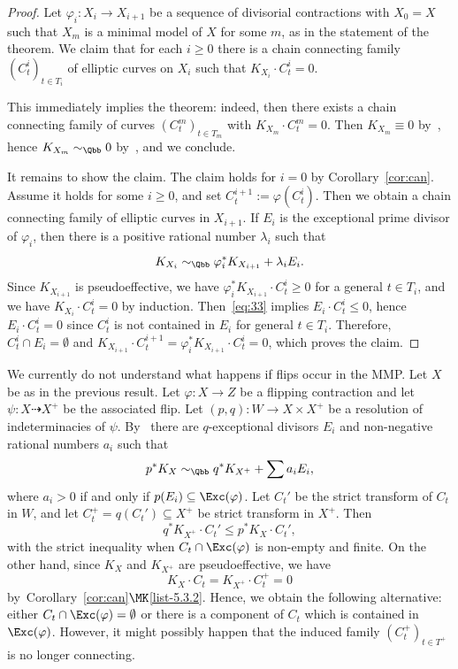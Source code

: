 \begin{proof}
Let $\varphi_i\colon X_i \to X_{i+1}$ be a sequence of divisorial contractions with $X_0=X$ such that $X_m$ is a minimal model of $X$ for some $m$, as in the statement of the theorem. We claim that for each $i\geq0$ there is a chain connecting family $(C_t^i)_{t\in T_i}$ of elliptic curves on $X_i$ such that $K_{X_i} \cdot C_t^i = 0$.

This immediately implies the theorem: indeed, then there exists a chain connecting family of curves $(C_t^m)_{t\in T_m}$ with $K_{X_m}\cdot C_t^m=0$. Then $K_{X_m} \equiv 0 $ by~\cite[Theorem~2.6]{BCE+}, hence $K_{X_m}\sim_\Qbb0$ by~\cite[Theorem~8.2]{Kaw85b}, and we conclude.


It remains to show the claim. The claim holds for $i=0$ by Corollary~\ref{cor:can}. Assume it holds for some $i\geq0$, and set $C_t^{i+1}:=\varphi(C_t^i)$. Then we obtain a chain connecting family of elliptic curves in $X_{i+1}$. If $E_i$ is the exceptional prime divisor of $\varphi_i$, then there is a positive rational number $\lambda_i$ such that
\begin{equation}\label{eq:33}
K_{X_i} \sim_\Qbb \varphi_i^*K_{X_{i+1}} + \lambda_i E_i.
\end{equation}
Since $K_{X_{i+1}}$ is pseudoeffective, we have $\varphi_i^*K_{X_{i+1}} \cdot C_t^i \geq 0 $ for a general $t\in T_i$, and we have $K_{X_i}\cdot C_t^i=0$ by induction. Then~\eqref{eq:33} implies $E_i \cdot C_t^i \leq 0$, hence $ E_i \cdot C_t^i = 0$ since $C_t^i$ is not contained in $E_i$ for general $t\in T_i$. Therefore, $C_t^i\cap E_i=\emptyset$ and $K_{X_{i+1}}\cdot C_t^{i+1}=\varphi_i^*K_{X_{i+1}} \cdot C_t^i = 0$, which proves the claim.
\end{proof}

\begin{rema}\label{rem1}
We currently do not understand what happens if flips occur in the MMP. Let $X$ be as in the previous result. Let $\varphi\colon X\to Z$ be a flipping contraction and let $ \psi\colon X \dasharrow X^+$ be the associated flip. Let $ (p,q)\colon W \to X\times X^+$ be a resolution of indeterminacies of $\psi$. By~\cite[Lemma~3.38]{KM98} there are $q$-exceptional divisors $E_i$ and non-negative rational numbers $a_i $ such that
\[
p^*K_X \sim_{\Qbb} q^*K_{X^+} + \sum a_i E_i,
\]
where $a_i>0$ if and only if $p(E_i)\subseteq\Exc(\varphi)$. Let $C_t'$ be the strict transform of $C_t$ in $W$, and let $C_t^+ = q(C_t') \subseteq X^+$ be strict transform in $X^+$. Then
\[
q^*K_{X^+} \cdot C_t' \leq p^*K_X \cdot C_t',
\]
with the strict inequality when $C_t\cap\Exc(\varphi)$ is non-empty and finite. On the other hand, since $K_X$ and $K_{X^+}$ are pseudoeffective, we have
\[
K_X\cdot C_t= K_{X^+} \cdot C_t^+ = 0
\]
by~Corollary~\ref{cor:can}$\MK$\eqref{list-5.3.2}. Hence, we obtain the following alternative: either $C_t\cap\Exc(\varphi)=\emptyset$ or there is a component of $C_t$ which is contained in $\Exc(\varphi)$. However, it might possibly happen that the induced family $(C_t^+)_{t\in T^+}$ is no longer connecting.
\end{rema}

